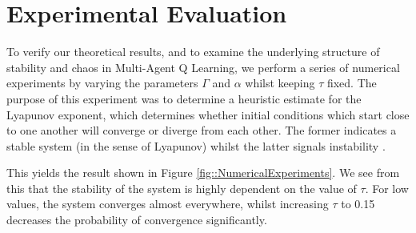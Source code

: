 \documentclass[letterpaper]{article} %
\begin{document}

\section{Experimental Evaluation}

To verify our theoretical results, and to examine the underlying structure of stability and chaos in
Multi-Agent Q Learning, we perform a series of numerical experiments by varying the parameters $\Gamma$ and
$\alpha$ whilst keeping $\tau$ fixed. The purpose of this experiment was to determine a heuristic estimate for the Lyapunov exponent, which determines whether initial conditions which start close to one another will converge or diverge from each other. The former indicates a stable system (in the sense of Lyapunov) whilst the latter signals instability .

This yields the result shown in
Figure \ref{fig::NumericalExperiments}. We see from this that the stability of the system is highly dependent on
the value of $\tau$.
For
low values, the system converges almost everywhere, whilst increasing $\tau$ to 0.15 decreases
the probability of convergence significantly.
\end{document}
